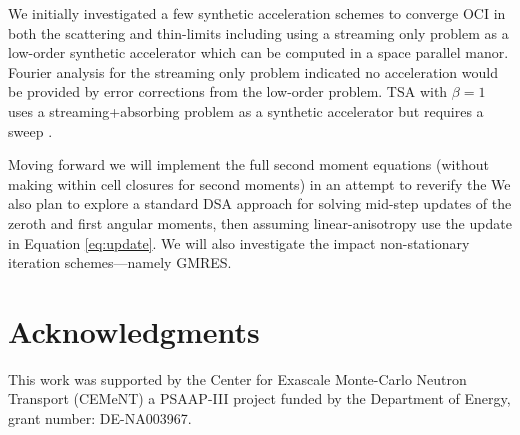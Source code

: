 We initially investigated a few synthetic acceleration schemes to converge OCI in both the scattering and thin-limits including using a streaming only problem as a low-order synthetic accelerator which can be computed in a space parallel manor.
Fourier analysis for the streaming only problem indicated no acceleration would be provided by error corrections from the low-order problem.
TSA with $\beta=1$  uses a streaming+absorbing problem as a synthetic accelerator but requires a sweep \cite{tsa2009rosa}.

Moving forward we will implement the full second moment equations (without making within cell closures for second moments) in an attempt to reverify the
We also plan to explore a standard DSA approach for solving mid-step updates of the zeroth and first angular moments, then assuming linear-anisotropy use the update in Equation \ref{eq:update}.
We will also investigate the impact non-stationary iteration schemes---namely GMRES.


\section*{Acknowledgments}

This work was supported by the Center for Exascale Monte-Carlo Neutron Transport (CEMeNT) a PSAAP-III project funded by the Department of Energy, grant number: DE-NA003967.
